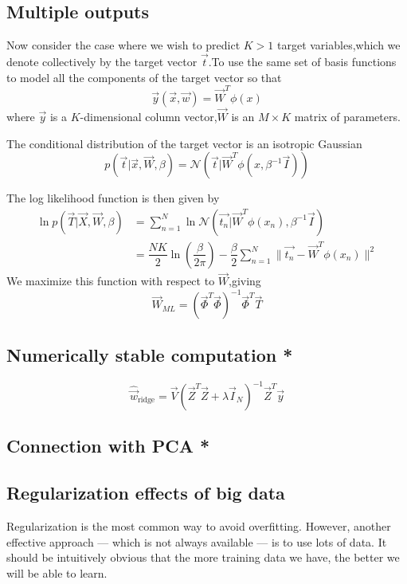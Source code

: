 \subsection{Multiple outputs}
Now consider the case where we wish to predict $K>1$ target variables,which we denote collectively by the target vector $\vec{t}$.To use the same set of basis functions to model all the components of the target vector so that
\begin{equation}
\vec{y}(\vec{x},\vec{w}) = \vec{W}^T\phi(x)
\end{equation}
where $\vec{y}$ is a $K$-dimensional column vector,$\vec{W}$ is an $M\times K$ matrix of parameters.

The conditional distribution of the target vector is an isotropic Gaussian
\begin{equation}
p(\vec{t}|\vec{x},\vec{W},\beta) =
\mathcal{N}(\vec{t}|\vec{W}^T\phi(x,\beta^{-1}\vec{I}))
\end{equation}

The log likelihood function is then given by 
\begin{align}
\ln p(\vec{T}|\vec{X},\vec{W},\beta) 
&=\sum_{n=1}^{N}\ln \mathcal{N}(\vec{t_n}|\vec{W}^T\phi(x_n),\beta^{-1}\vec{I}) \\
&=\dfrac{NK}{2}\ln(\dfrac{\beta}{2\pi}) 
 -\dfrac{\beta}{2}\sum_{n=1}^{N}\parallel \vec{t_n}-\vec{W}^T\phi(x_n)\parallel^2
\end{align}
We maximize this function with respect to $\vec{W}$,giving
\begin{equation}
\vec{W}_{ML} = (\vec{\Phi}^T\vec{\Phi})^{-1}\vec{\Phi}^T\vec{T}
\end{equation}


\subsection{Numerically stable computation *}

\begin{equation}\label{eqn:Ridge-regression-SVD}
\hat{\vec{w}}_{\mathrm{ridge}}=\vec{V}(\vec{Z}^T\vec{Z}+\lambda\vec{I}_N)^{-1}\vec{Z}^T\vec{y}
\end{equation}


\subsection{Connection with PCA *}


\subsection{Regularization effects of big data}
Regularization is the most common way to avoid overfitting. However, another effective approach — which is not always available — is to use lots of data. It should be intuitively obvious that the more training data we have, the better we will be able to learn.

